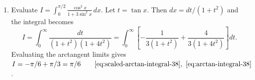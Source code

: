 \begin{enumerate}[label=\theenumi,leftmargin=4mm,itemsep=9pt]
\[\setcounter{enumi}{36}\item A trust receives Rs. 30,000 per month. Half is spent on care, and 2\% of the amount spent is collected from beneficiaries. The unspent balance is deposited in a bank. Find the monthly interest rate needed for total monthly income of Rs. 1800.
\solution Let $u$ be the monthly contribution collected from beneficiaries and $v$ the bank interest. Half of Rs. $30,000$ is spent, so
\[
u=0.02(15000)=300.
\]
The total monthly income is Rs. $1800$, so
\[
u+v=1800,\qquad u=300.
\]
Write this system as an augmented matrix:
\[
\left[\begin{array}{cc|c}1&1&1800\\1&0&300\end{array}\right]
\xrightarrow{R_2\leftarrow R_2-R_1}
\left[\begin{array}{cc|c}1&1&1800\\0&-1&-1500\end{array}\right]
\xrightarrow{R_2\leftarrow -R_2}
\left[\begin{array}{cc|c}1&1&1800\\0&1&1500\end{array}\right].
\]
Eliminate $v$ from the first row:
\[
R_1\leftarrow R_1-R_2:\qquad
\left[\begin{array}{cc|c}1&0&300\\0&1&1500\end{array}\right]\qquad\eqref{eq:gaussian-elimination}.
\]
Thus $u=300$ and $v=1500$. The deposit is Rs. $15000$, therefore
\[
r=\frac{1500}{15000}\times100\%=10\%\text{ per month}.
\]
\par\smallskip
\noindent\textbf{Code reference -}
\par\noindent{}
\par\smallskip



\paragraph*{Integration and area}
\setcounter{enumi}{37}\item Evaluate $\displaystyle I=\int_0^{\pi/2}\frac{\cos^2x}{1+3\sin^2x}\,dx$.
\solution Let $t=\tan x$. Then $dx=dt/(1+t^2)$ and the integral becomes
\[
I=\int_0^\infty\frac{dt}{(1+t^2)(1+4t^2)}=\int_0^\infty\left[-\frac1{3(1+t^2)}+\frac4{3(1+4t^2)}\right]dt.
\]
Evaluating the arctangent limits gives $I=-\pi/6+\pi/3=\pi/6\qquad\eqref{eq:scaled-arctan-integral-38},\ \eqref{eq:arctan-integral-38}$.

\]
\end{enumerate}
